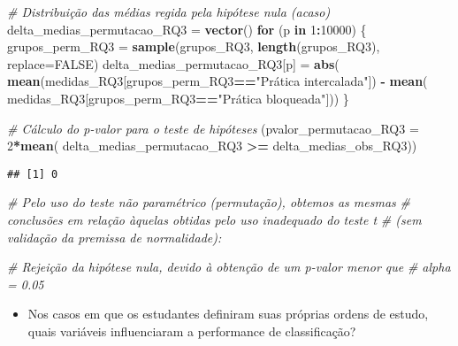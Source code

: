 \documentclass[
]{article}
\newenvironment{Shaded}{\begin{snugshade}}{\end{snugshade}}
\newcommand{\AttributeTok}[1]{\textcolor[rgb]{0.13,0.29,0.53}{#1}}
\newcommand{\CommentTok}[1]{\textcolor[rgb]{0.56,0.35,0.01}{\textit{#1}}}
\newcommand{\ConstantTok}[1]{\textcolor[rgb]{0.56,0.35,0.01}{#1}}
\newcommand{\ControlFlowTok}[1]{\textcolor[rgb]{0.13,0.29,0.53}{\textbf{#1}}}
\newcommand{\DecValTok}[1]{\textcolor[rgb]{0.00,0.00,0.81}{#1}}
\newcommand{\FunctionTok}[1]{\textcolor[rgb]{0.13,0.29,0.53}{\textbf{#1}}}
\newcommand{\NormalTok}[1]{#1}
\newcommand{\OtherTok}[1]{\textcolor[rgb]{0.56,0.35,0.01}{#1}}
\newcommand{\SpecialCharTok}[1]{\textcolor[rgb]{0.81,0.36,0.00}{\textbf{#1}}}
\newcommand{\StringTok}[1]{\textcolor[rgb]{0.31,0.60,0.02}{#1}}
\providecommand{\tightlist}{%
  \setlength{\itemsep}{0pt}\setlength{\parskip}{0pt}}
\begin{document}
\begin{Shaded}
\begin{Highlighting}[]
\CommentTok{\# Distribuição das médias regida pela hipótese nula (acaso)}
\NormalTok{delta\_medias\_permutacao\_RQ3 }\OtherTok{=} \FunctionTok{vector}\NormalTok{()}
\ControlFlowTok{for}\NormalTok{ (p }\ControlFlowTok{in} \DecValTok{1}\SpecialCharTok{:}\DecValTok{10000}\NormalTok{)}
\NormalTok{\{}
\NormalTok{  grupos\_perm\_RQ3 }\OtherTok{=} \FunctionTok{sample}\NormalTok{(grupos\_RQ3, }\FunctionTok{length}\NormalTok{(grupos\_RQ3), }\AttributeTok{replace=}\ConstantTok{FALSE}\NormalTok{)}
\NormalTok{  delta\_medias\_permutacao\_RQ3[p] }\OtherTok{=} \FunctionTok{abs}\NormalTok{(}
    \FunctionTok{mean}\NormalTok{(medidas\_RQ3[grupos\_perm\_RQ3}\SpecialCharTok{==}\StringTok{"Prática intercalada"}\NormalTok{]) }\SpecialCharTok{{-}} \FunctionTok{mean}\NormalTok{(}
\NormalTok{        medidas\_RQ3[grupos\_perm\_RQ3}\SpecialCharTok{==}\StringTok{"Prática bloqueada"}\NormalTok{]))}
\NormalTok{\}}

\CommentTok{\# Cálculo do p{-}valor para o teste de hipóteses}
\NormalTok{(}\AttributeTok{pvalor\_permutacao\_RQ3 =} \DecValTok{2}\SpecialCharTok{*}\FunctionTok{mean}\NormalTok{(}
\NormalTok{    delta\_medias\_permutacao\_RQ3 }\SpecialCharTok{\textgreater{}=}\NormalTok{ delta\_medias\_obs\_RQ3))}
\end{Highlighting}
\end{Shaded}

\begin{verbatim}
## [1] 0
\end{verbatim}

\begin{Shaded}
\begin{Highlighting}[]
\CommentTok{\# Pelo uso do teste não paramétrico (permutação), obtemos as mesmas}
\CommentTok{\# conclusões em relação àquelas obtidas pelo uso inadequado do teste t}
\CommentTok{\# (sem validação da premissa de normalidade):}

\CommentTok{\# Rejeição da hipótese nula, devido à obtenção de um p{-}valor menor que}
\CommentTok{\# alpha = 0.05}
\end{Highlighting}
\end{Shaded}

\begin{itemize}
\tightlist
\item
  Nos casos em que os estudantes definiram suas próprias ordens de
  estudo, quais variáveis influenciaram a performance de classificação?
\end{itemize}
\end{document}
